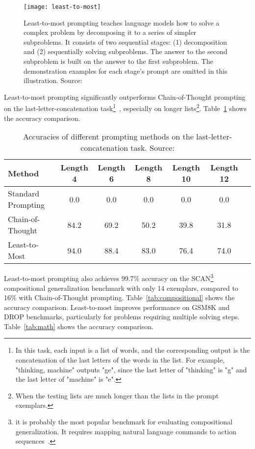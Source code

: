 \begin{figure}[ht]
	\centering
	\texttt{[image: least-to-most]}
	\caption{Least-to-most prompting teaches language models how to solve a complex problem by decomposing it to a series of simpler subproblems. It consists of two sequential stages: (1) decomposition and (2) sequentially solving subproblems. The answer to the second subproblem is built on the answer to the first subproblem. The demonstration examples for each stage’s prompt are omitted in this illustration. Source: \textcite{zhou2022least}}
	\label{fig:least-to-most}
\end{figure}

Least-to-most prompting significantly outperforms Chain-of-Thought prompting on the last-letter-concatenation task\footnote{In this task, each input is a list of words, and the corresponding output is the concatenation of the last letters of the words in the list. For example, "thinking, machine" outputs "ge", since the last letter of "thinking" is "g" and the last letter of "machine" is "e".}~\cite{wei2022chain}, especially on longer lists\footnote{When the testing lists are much longer than the lists in the prompt exemplars.}.
Table~\ref{tab:symbolic} shows the accuracy comparison.

\begin{table}[h!]
	\centering
	\begin{tabularx}{\textwidth}{Xcccccc}
		\hline
		\textbf{Method}    & \textbf{Length 4} & \textbf{Length 6} & \textbf{Length 8} & \textbf{Length 10} & \textbf{Length 12} \\
		\hline
		Standard Prompting & 0.0               & 0.0               & 0.0               & 0.0                & 0.0                \\
		Chain-of-Thought   & 84.2              & 69.2              & 50.2              & 39.8               & 31.8               \\
		Least-to-Most      & 94.0              & 88.4              & 83.0              & 76.4               & 74.0               \\
		\hline
	\end{tabularx}
	\caption{Accuracies of different prompting methods on the last-letter-concatenation task. Source: \textcite{zhou2022least}}
	\label{tab:symbolic}
\end{table}

Least-to-most prompting also achieves 99.7\% accuracy on the SCAN\footnote{it is probably the most popular benchmark for evaluating compositional generalization. It requires mapping natural language commands to action sequences~\cite{lake2018generalization}.} compositional generalization benchmark with only 14 exemplars, compared to 16\% with Chain-of-Thought prompting.
Table~\ref{tab:compositional} shows the accuracy comparison.
Least-to-most improves performance on GSM8K and DROP benchmarks, particularly for problems requiring multiple solving steps.
Table~\ref{tab:math} shows the accuracy comparison.

